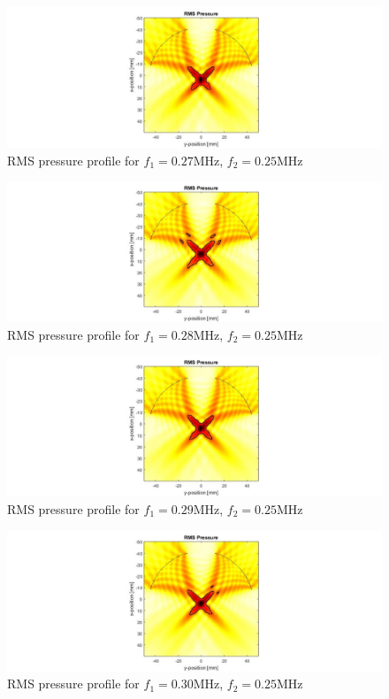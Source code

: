 \documentclass[10pt,a4paper]{article}
\begin{document}
\begin{figure}[!h]\label{f270kHz}
\hspace*{-5cm}                                                    
\includegraphics[scale=0.6]{f270kHz}
\caption{RMS pressure profile for $f_1 = 0.27$MHz, $f_2 = 0.25$MHz}
\end{figure}
\begin{figure}[!h]\label{f280kHz}
\hspace*{-5cm}                                                    
\includegraphics[scale=0.6]{f280kHz}
\caption{RMS pressure profile for $f_1 = 0.28$MHz, $f_2 = 0.25$MHz}
\end{figure}
\begin{figure}[!h]\label{f290kHz}
\hspace*{-5cm}                                                    
\includegraphics[scale=0.6]{f290kHz}
\caption{RMS pressure profile for $f_1 = 0.29$MHz, $f_2 = 0.25$MHz}
\end{figure}
\begin{figure}[!h]\label{f300kHz}
\hspace*{-5cm}                                                    
\includegraphics[scale=0.6]{f300kHz}
\caption{RMS pressure profile for $f_1 = 0.30$MHz, $f_2 = 0.25$MHz}
\end{figure}
\end{document}

